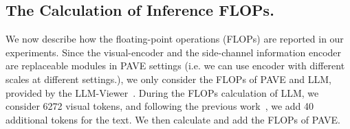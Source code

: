 \subsection{The Calculation of Inference FLOPs.} \label{flops_calc}
We now describe how the floating-point operations (FLOPs) are reported in our experiments.
Since the visual-encoder and the side-channel information encoder are replaceable modules in PAVE settings (i.e. we can use encoder with different scales at different settings.), we only consider the FLOPs of PAVE and LLM, provided by the LLM-Viewer~\cite{yuan2024llm}. During the FLOPs calculation of LLM, we consider 6272 visual tokens, and following the previous work~\cite{shang2024llavaprumergeadaptivetokenreduction}, we add 40 additional tokens for the text. We then calculate and add the FLOPs of PAVE. 

%



